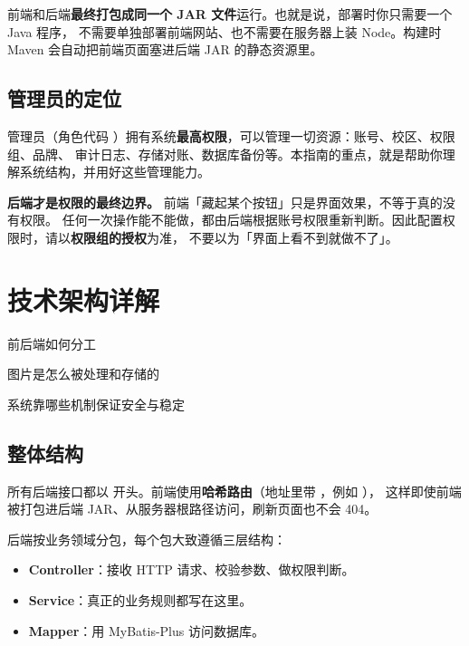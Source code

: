 \documentclass[cn,11pt,green]{elegantbook}
\begin{document}
\begin{notebox}[打包方式]
  前端和后端\textbf{最终打包成同一个 JAR 文件}运行。也就是说，部署时你只需要一个 Java 程序，
  不需要单独部署前端网站、也不需要在服务器上装 Node。构建时 Maven 会自动把前端页面塞进后端 JAR 的静态资源里。
\end{notebox}

\section{管理员的定位}

管理员（角色代码 ）拥有系统\textbf{最高权限}，可以管理一切资源：账号、校区、权限组、品牌、
审计日志、存储对账、数据库备份等。本指南的重点，就是帮助你理解系统结构，并用好这些管理能力。

\begin{warnbox}[一条贯穿全书的安全原则]
  \textbf{后端才是权限的最终边界。} 前端「藏起某个按钮」只是界面效果，不等于真的没有权限。
  任何一次操作能不能做，都由后端根据账号权限重新判断。因此配置权限时，请以\textbf{权限组的授权}为准，
  不要以为「界面上看不到就做不了」。
\end{warnbox}

\chapter{技术架构详解}

\begin{introduction}
  \item 前后端如何分工
  \item 图片是怎么被处理和存储的
  \item 系统靠哪些机制保证安全与稳定
\end{introduction}

\section{整体结构}

所有后端接口都以  开头。前端使用\textbf{哈希路由}（地址里带 \code{\#}，例如 ），
这样即使前端被打包进后端 JAR、从服务器根路径访问，刷新页面也不会 404。

后端按业务领域分包，每个包大致遵循三层结构：

\begin{itemize}
  \item \textbf{Controller}：接收 HTTP 请求、校验参数、做权限判断。
  \item \textbf{Service}：真正的业务规则都写在这里。
  \item \textbf{Mapper}：用 MyBatis-Plus 访问数据库。
\end{itemize}
\end{document}
